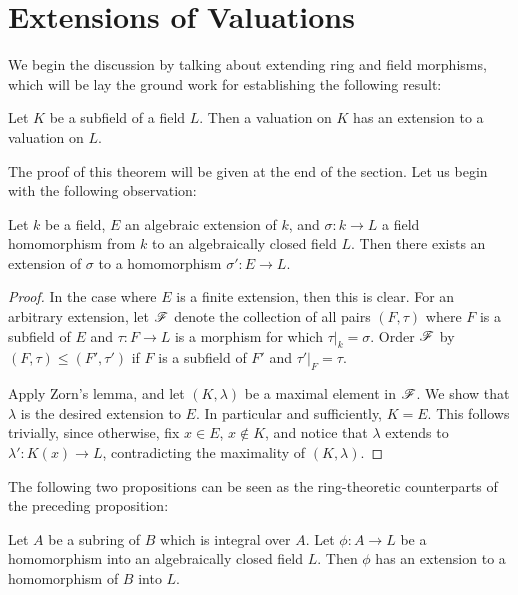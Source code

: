 \section{Extensions of Valuations}

We begin the discussion by talking about extending ring and field 
morphisms, which will be lay the ground work for establishing the 
following result:

\begin{thm}\label{thm_ext_val}
Let $K$ be a subfield of a field $L$. Then a valuation on $K$ has 
an extension to a valuation on $L$.
\end{thm}

The proof of this theorem will be given at the end of the section.
Let us begin with the following observation:

\begin{prop}
Let $k$ be a field, $E$ an algebraic extension of $k$, and 
$\sigma: k \to L$ a field homomorphism from $k$ to an 
algebraically closed field $L$. Then there exists an extension of 
$\sigma$ to a homomorphism $\sigma': E \to L$.
\end{prop}

\begin{proof}
In the case where $E$ is a finite extension, then this is clear.
For an arbitrary extension, let $\mathscr{F}$ denote the collection
of all pairs $(F, \tau)$ where $F$ is a subfield of $E$ and 
$\tau: F \to L$ is a morphism for which $\tau|_k = \sigma$. 
Order $\mathscr{F}$ by $(F, \tau) \leq (F', \tau')$ if $F$ is a 
subfield of $F'$ and $\tau'|_F = \tau$.

Apply Zorn's lemma, and let $(K, \lambda)$ be a maximal element
in $\mathscr{F}$. We show that $\lambda$ is the desired extension to 
$E$. In particular and sufficiently, $K = E$. This follows 
trivially, since otherwise, fix $x \in E$, $x \notin K$, and 
notice that $\lambda$ extends to $\lambda': K(x) \to L$, 
contradicting the maximality of $(K, \lambda)$.
\end{proof}

The following two propositions can be seen as the ring-theoretic
counterparts of the preceding proposition:

\begin{prop}\label{prop_lang_3_1}
Let $A$ be a subring of $B$ which is integral over $A$. Let
$\phi: A \to L$ be a homomorphism into an algebraically closed 
field $L$. Then $\phi$ has an extension to a homomorphism of $B$
into $L$.
\end{prop}

